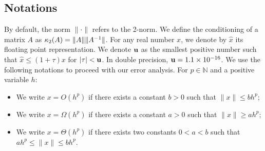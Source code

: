 \subsection{Notations}
By default, the norm $\|\cdot\|$ refers to the 2-norm.
We define the conditioning of a matrix $A$ as
$\kappa_2(A) = \| A \| \|A^{-1} \|$. %
For any real number $x$, we denote by $\widehat{x}$ its floating
point representation.
We denote $\mathbf{u}$ as the smallest positive number such that
$\widehat{x} \leq (1 + \tau) x$ for $|\tau| < \mathbf{u}$.
In double precision, $\mathbf{u} = 1.1 \times 10^{-16}$.
We use the following notations to proceed with our error analysis.
For $p \in \mathbb{N}$ and a positive variable $h$:
\begin{itemize}
  \item We write $x = O(h^p)$ if there exists a constant $b > 0$
    such that $\| x \| \leq b h^p$;
  \item We write $x = \Omega(h^p)$ if there exists a constant $a > 0$
    such that $\| x \| \geq a h^p$;
  \item We write $x = \Theta(h^p)$ if there exists two constants $0 < a < b$
    such that $a h^p \leq \| x \| \leq b h^p$.
\end{itemize}

